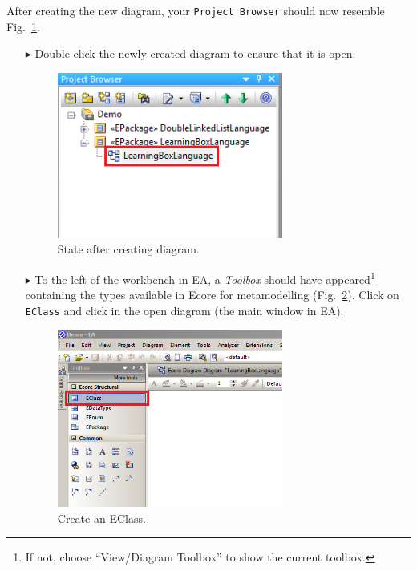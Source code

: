After creating the new diagram, your  \texttt{Project Browser} should now resemble Fig.~\ref{fig:diagram_completed}.

\begin{enumerate}
\item[$\blacktriangleright$] Double-click the newly created diagram to ensure that it is open.

\begin{figure}[htbp]
	\centering
  \includegraphics[width=0.7\textwidth]{pics/memBoxBilder/memBox06.png}
	\caption{State after creating diagram.}
	\label{fig:diagram_completed}
\end{figure}

\item[$\blacktriangleright$] To the left of the workbench in EA, a \emph{Toolbox} should have appeared\footnote{If not, choose ``View/Diagram Toolbox'' to show the current toolbox.} containing the types available in Ecore for metamodelling (Fig.~\ref{fig:eclass}).
Click on \texttt{EClass} and click in the open diagram (the main window in EA).

\begin{figure}[htbp]
	\centering
  \includegraphics[width=0.7\textwidth]{pics/memBoxBilder/memBox07.png}
	\caption{Create an EClass.}
	\label{fig:eclass}
\end{figure}



\end{enumerate}
